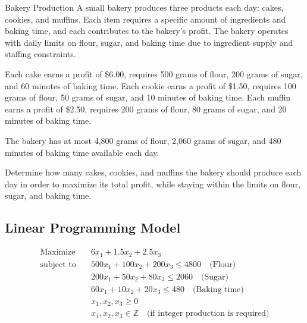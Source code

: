 \newpage
\begin{examplewithallcode}{Bakery Production}{}{}{}
A small bakery produces three products each day: cakes, cookies, and muffins. Each item requires a specific amount of ingredients and baking time, and each contributes to the bakery’s profit. The bakery operates with daily limits on flour, sugar, and baking time due to ingredient supply and staffing constraints.

Each cake earns a profit of \$6.00, requires 500 grams of flour, 200 grams of sugar, and 60 minutes of baking time. Each cookie earns a profit of \$1.50, requires 100 grams of flour, 50 grams of sugar, and 10 minutes of baking time. Each muffin earns a profit of \$2.50, requires 200 grams of flour, 80 grams of sugar, and 20 minutes of baking time.

The bakery has at most 4,800 grams of flour, 2,060 grams of sugar, and 480 minutes of baking time available each day.

Determine how many cakes, cookies, and muffins the bakery should produce each day in order to maximize its total profit, while staying within the limits on flour, sugar, and baking time.



\subsection*{Linear Programming Model}

\[
\begin{aligned}
\text{Maximize} \quad & 6x_1 + 1.5x_2 + 2.5x_3 \\
\text{subject to} \quad
& 500x_1 + 100x_2 + 200x_3 \leq 4800 \quad \text{(Flour)} \\
& 200x_1 + 50x_2 + 80x_3 \leq 2060 \quad \text{(Sugar)} \\
& 60x_1 + 10x_2 + 20x_3 \leq 480 \quad \text{(Baking time)} \\
& x_1, x_2, x_3 \geq 0 \\
& x_1, x_2, x_3 \in \mathbb{Z} \quad \text{(if integer production is required)}
\end{aligned}
\]
\end{examplewithallcode}

